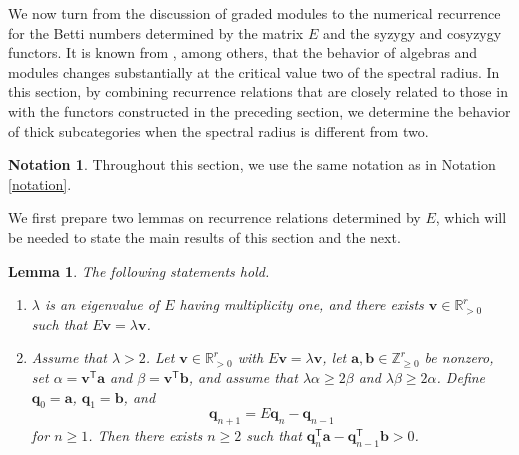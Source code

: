 \documentclass{amsart}
\newtheorem{lem}[thm]{Lemma}
\theoremstyle{definition}
\newtheorem{nota}[thm]{Notation}
\theoremstyle{remark}
\numberwithin{equation}{thm}
\def\ge{\geqslant}
\def\T{\mathsf{T}}
\def\bfa{\mathbf{a}}
\def\bfb{\mathbf{b}}
\def\bfq{\mathbf{q}}
\def\bfv{\mathbf{v}}
\begin{document}
We now turn from the discussion of graded modules to the numerical recurrence for the Betti numbers determined by the matrix $E$ and the syzygy and cosyzygy functors.
It is known from \cite{Ben, E, ESo, ESo2}, among others, that the behavior of algebras and modules changes substantially at the critical value two of the spectral radius.
In this section, by combining recurrence relations that are closely related to those in \cite{E} with the functors constructed in the preceding section, we determine the behavior of thick subcategories when the spectral radius is different from two.

\begin{nota}
Throughout this section, we use the same notation as in Notation \ref{notation}.
\end{nota}

We first prepare two lemmas on recurrence relations determined by $E$, which will be needed to state the main results of this section and the next.

\begin{lem}\label{zenkashki}
The following statements hold.
\begin{enumerate}[{\rm (1)}]
\item $\lambda$ is an eigenvalue of $E$ having multiplicity one, and there exists $\bfv\in\mathbb{R}_{>0}^r$ such that $E\bfv=\lambda\bfv$.
\item Assume that $\lambda>2$. Let $\bfv\in\mathbb{R}_{>0}^r$ with $E\bfv=\lambda\bfv$, let $\bfa,\bfb\in\mathbb{Z}_{\ge0}^r$ be nonzero, set
$\alpha=\bfv^{\T}\bfa$ and
$\beta=\bfv^{\T}\bfb$, and assume that
$\lambda\alpha\ge2\beta$ and $\lambda\beta\ge2\alpha$.
Define $\bfq_0=\bfa$, $\bfq_1=\bfb$, and
$$
\bfq_{n+1}=E\bfq_n-\bfq_{n-1}
$$
for $n\ge1$. Then there exists $n\ge2$ such that $\bfq_n^{\T}\bfa-\bfq_{n-1}^{\T}\bfb>0$.
\end{enumerate}
\end{lem}
\end{document}
